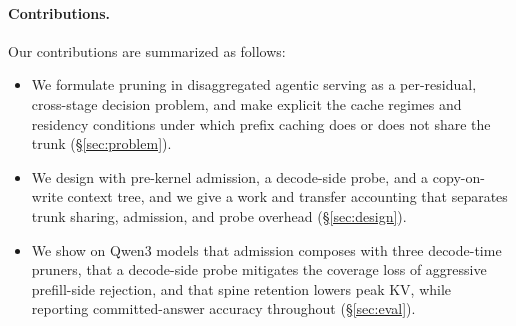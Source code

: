 \paragraph{Contributions.}
Our contributions are summarized as follows:
\begin{itemize}[leftmargin=*,itemsep=1pt,topsep=2pt]
\item We formulate pruning in disaggregated agentic serving as a per-residual, cross-stage decision problem, and make explicit the cache regimes and residency conditions under which prefix caching does or does not share the trunk (\S\ref{sec:problem}).
\item We design \sys with pre-kernel admission, a decode-side probe, and a copy-on-write context tree, and we give a work and transfer accounting that separates trunk sharing, admission, and probe overhead (\S\ref{sec:design}).
\item We show on Qwen3 models that admission composes with three decode-time pruners, that a decode-side probe mitigates the coverage loss of aggressive prefill-side rejection, and that spine retention lowers peak KV, while reporting committed-answer accuracy throughout (\S\ref{sec:eval}).
\end{itemize}
